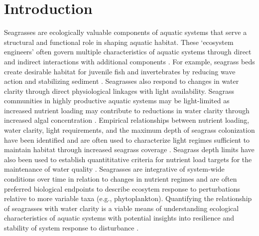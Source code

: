 \documentclass[letterpaper,12pt,oneside]{article}\usepackage[]{graphicx}\usepackage[]{color}
\begin{document}
\clearpage

\acresetall

\section{Introduction}

Seagrasses are ecologically valuable components of aquatic systems that serve a structural and functional role in shaping aquatic habitat.  These `ecosystem engineers' often govern multiple characteristics of aquatic systems through direct and indirect interactions with additional components \citep{Jones94,Koch01}.  For example, seagrass beds create desirable habitat for juvenile fish and invertebrates by reducing wave action and stabilizing sediment \citep{williams01,Hughes09}.  Seagrasses also respond to changes in water clarity through direct physiological linkages with light availability.  Seagrass communities in highly productive aquatic systems may be light-limited as increased nutrient loading may contribute to reductions in water clarity through increased algal concentration \citep{Duarte95}.  Empirical relationships between nutrient loading, water clarity, light requirements, and the maximum depth of seagrass colonization have been identified \citep{Duarte91,Kenworthy96,Choice14} and are often used to characterize light regimes sufficient to maintain habitat through increased seagrass coverage \citep{Steward05}.  Seagrass depth limits have also been used to establish quantititative criteria for nutrient load targets for the maintenance of water quality \citep{Janicki96}.  Seagrasses are integrative of system-wide conditions over time in relation to changes in nutrient regimes \citep{Duarte95} and are often preferred biological endpoints to describe ecosytem response to perturbations relative to more variable taxa (e.g., phytoplankton).  Quantifying the relationship of seagrasses with water clarity is a viable means of understanding ecological characteristics of aquatic systems with potential insights into resilience and stability of system response to disturbance \citep{Greve05}.    
\end{document}

